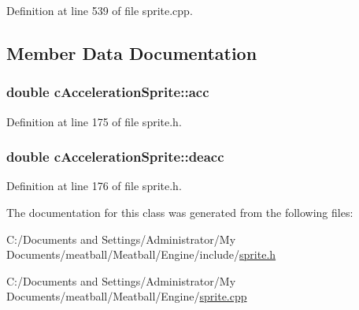 Definition at line 539 of file sprite.\-cpp.



\subsection{Member Data Documentation}
\hypertarget{classc_acceleration_sprite_aa09f3836673b3b48058edd7ca6876309}{
\subsubsection[{acc}]{\setlength{\rightskip}{0pt plus 5cm}double c\-Acceleration\-Sprite\-::acc}}\label{classc_acceleration_sprite_aa09f3836673b3b48058edd7ca6876309}


Definition at line 175 of file sprite.\-h.

\hypertarget{classc_acceleration_sprite_aabd23a5d522e74532f5870ec8e28eaf6}{
\subsubsection[{deacc}]{\setlength{\rightskip}{0pt plus 5cm}double c\-Acceleration\-Sprite\-::deacc}}\label{classc_acceleration_sprite_aabd23a5d522e74532f5870ec8e28eaf6}


Definition at line 176 of file sprite.\-h.



The documentation for this class was generated from the following files\-:\begin{DoxyCompactItemize}
\item 
C\-:/\-Documents and Settings/\-Administrator/\-My Documents/meatball/\-Meatball/\-Engine/include/\hyperlink{_engine_2include_2sprite_8h}{sprite.\-h}\item 
C\-:/\-Documents and Settings/\-Administrator/\-My Documents/meatball/\-Meatball/\-Engine/\hyperlink{_engine_2sprite_8cpp}{sprite.\-cpp}\end{DoxyCompactItemize}
